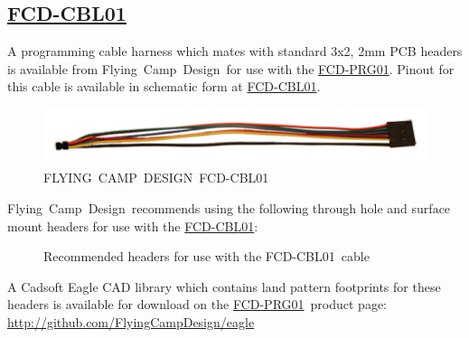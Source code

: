 \documentclass[10pt,letterpaper]{datasheet}
\newcommand{\PIDNOLINK}{FCD\nobreakdash-PRG01}
\newcommand{\PID}{\href{http://www.flyingcampdesign.com/msp430-bsl-programmer.html}{\PIDNOLINK}}
\newcommand{\PIDCBLNOLINK}{FCD-CBL01}
\newcommand{\PIDCBL}{\href{http://www.flyingcampdesign.com/msp430-bsl-programmer.html}{\PIDCBLNOLINK}}
\newcommand{\fcd}{Flying~Camp~Design}
\newcommand{\FCD}{FLYING~CAMP~DESIGN}
\newcommand{\githuburleagle}{\href{http://github.com/FlyingCampDesign/eagle}{http://github.com/FlyingCampDesign/eagle}}
\begin{document}
\subsection*{\PIDCBL}
\begin{flushleft}
  A programming cable harness which mates with standard 3x2, 2mm PCB headers is available from \fcd\ for use with the \PID.  Pinout for this cable is available in schematic form at \PIDCBL.

  \begin{figure}[!h]
    \label{fig:fcd-cbl01}
    \begin{center}
      \includegraphics[]{fcd-cbl01}
    \end{center}
    \caption{\FCD\ \PIDCBLNOLINK}
  \end{figure}

  \fcd\ recommends using the following through hole and surface mount headers for use with the \PIDCBL:

  \begin{figure}[!h]
    \label{fig:rec-prog-hdr}
    \begin{center}
      \caption{Recommended headers for use with the \PIDCBLNOLINK\ cable}
    \end{center}
  \end{figure}

  A Cadsoft Eagle CAD library which contains land pattern footprints for these headers is available for download on the \PID\ product page: \githuburleagle \newline


\end{flushleft}
\end{document}
